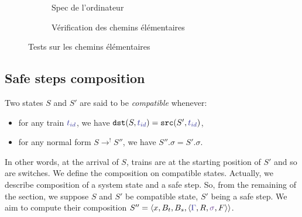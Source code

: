 \documentclass[runningheads]{llncs}
\newcommand{\tuple}[1]{\ensuremath{\langle #1\rangle}}
\newcommand{\swFmt}[1]{{\color{swcolor}{#1}}}
\newcommand{\switches}{\ensuremath{\swFmt{\sigma}}}
\newcommand{\trainFmt}[1]{{\color{traincolor} #1}}
\newcommand{\trainSeq}{\trainFmt{\Gamma\xspace}}
\newcommand{\tid}[1]{\ensuremath{\trainFmt{t_{#1}}}}
\newcommand{\regulator}{\ensuremath{R}}
\newcommand{\signals}{\ensuremath{F}}
\newcommand{\stateTuple}[4]{\tuple{#1, #2, #3, #4}}
\newcommand{\bufferFmt}[1]{#1}
\newcommand{\bufTrain}{\ensuremath{\bufferFmt{B_t}}\xspace}
\newcommand{\bufSig}{\ensuremath{\bufferFmt{B_s}}\xspace}
\newcommand{\reduces}{\ensuremath{\rightarrow}}
\newcommand{\redTuple}[4]{\ensuremath{\tuple{#1, \bufferFmt{#2}, \bufferFmt{#3}, #4}}}
\begin{document}

\begin{figure}
	\begin{subfigure}{0.5\textwidth}
		\centering
		\caption{Spec de l'ordinateur}
	\end{subfigure}
	\begin{subfigure}{0.5\textwidth}
		\centering
		\caption{Vérification des chemins élémentaires}
	\end{subfigure}
	\caption{Tests sur les chemins élémentaires}
\end{figure}
\label{fig:elem-tests}


\subsection{Safe steps composition}

Two states $S$ and $S'$ are said to be \emph{compatible} whenever:
\begin{itemize}
\item for any train $\tid{id}$, we have $\mathtt{dst}(S, \tid{id})  =  \mathtt{src}(S', \tid{id})$,
\item for any normal form $S \reduces^! S''$, we have $S''.\sigma = S'.\sigma$.
\end{itemize}
In other words, at the arrival of $S$, trains are at the starting position of $S'$ and so are switches. We define the composition on compatible states. Actually, we describe composition of a system state and a safe step. So, from the remaining of the section, we suppose $S$ and $S'$ be compatible state, $S'$ being a safe step. We aim to compute their composition $S''  = \redTuple{x}{\bufTrain}{\bufSig}{\stateTuple{\trainSeq}{\regulator}{\switches}{\signals}}$.
\end{document}
